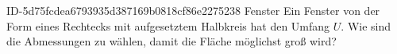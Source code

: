 \begin{exercise}
      {ID-5d75fcdea6793935d387169b0818cf86e2275238}
      {Fenster}
  \ifproblem\problem
    Ein Fenster von der Form eines Rechtecks mit aufgesetztem Halbkreis hat den Umfang $U$.
    Wie sind die Abmessungen zu wählen, damit die Fläche möglichst groß wird?
  \fi
\end{exercise}
